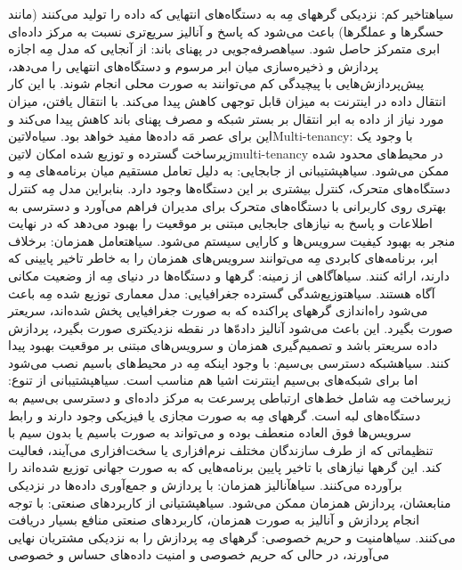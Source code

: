  ‌سیاه{تاخیر کم}: نزدیکی گرههای مِه به دستگاه‌های انتهایی که داده را تولید می‌کنند (مانند حسگرها و عملگرها) باعث می‌شود که پاسخ و آنالیز سریع‌تری
نسبت به مرکز داده‌ای ابری متمرکز حاصل شود.
 ‌سیاه{صرفه‌جویی در پهنای باند}: از آنجایی که مدل مِه اجازه پردازش و ذخیره‌سازی میان ابر مرسوم و دستگاه‌های انتهایی را می‌دهد،
پیش‌پردازش‌هایی با پیچیدگی کم می‌توانند به صورت محلی انجام شوند. با این کار انتقال داده در اینترنت به میزان قابل توجهی کاهش پیدا می‌کند.
با انتقال یافتن، میزان مورد نیاز از داده به ابر انتقال بر بستر شبکه و مصرف پهنای باند کاهش پیدا می‌کند و این برای عصر مَه داده‌ها مفید خواهد بود.
 ‌سیاه{‌لاتین{Multi-tenancy}}: با وجود یک زیرساخت گسترده و توزیع شده امکان ‌لاتین{multi-tenancy} در محیط‌های محدود شده ممکن می‌شود.
 ‌سیاه{پشتیبانی از جابجایی}: به دلیل تعامل مستقیم میان برنامه‌های مِه و دستگاه‌های متحرک، کنترل بیشتری بر این دستگاه‌ها وجود دارد.
بنابراین مدل مِه کنترل بهتری روی کاربرانی با دستگاه‌های متحرک برای مدیران فراهم می‌آورد و دسترسی به اطلاعات و پاسخ به نیازهای جابجایی مبتنی بر موقعیت
را بهبود می‌دهد که در نهایت منجر به بهبود کیفیت سرویس‌ها و کارایی سیستم می‌شود.
 ‌سیاه{تعامل همزمان}: برخلاف ابر، برنامه‌های کابردی مِه می‌توانند سرویس‌های همزمان را به خاطر تاخیر پایینی که دارند، ارائه کنند.
 ‌سیاه{آگاهی از زمینه}: گرهها و دستگاه‌ها در دنیای مِه از وضعیت مکانی آگاه هستند.
 ‌سیاه{توزیع‌شدگی گسترده جغرافیایی}: مدل معماری توزیع شده مِه باعث می‌شود راه‌اندازی گرههای پراکنده که به صورت جغرافیایی پخش شده‌اند،
سریعتر صورت بگیرد. این باعث می‌شود آنالیز داده‌ّها در نقطه نزدیکتری صورت بگیرد، پردازش داده سریعتر باشد و تصمیم‌گیری همزمان و سرویس‌های مبتنی
بر موقعیت بهبود پیدا کنند.
 ‌سیاه{شبکه دسترسی بی‌سیم}: با وجود اینکه مِه در محیط‌های باسیم نصب می‌شود اما برای شبکه‌های بی‌سیم اینترنت اشیا هم مناسب است.
 ‌سیاه{پشتیبانی از تنوع}: زیرساخت مِه شامل خط‌های ارتباطی پرسرعت به مرکز داده‌ای و دسترسی بی‌سیم به دستگاه‌های لبه است.
گرههای مِه به صورت مجازی یا فیزیکی وجود دارند و رابط سرویس‌ها فوق العاده منعطف بوده و می‌تواند به صورت باسیم یا بدون سیم با تنظیماتی که از طرف
سازندگان مختلف نرم‌افزاری یا سخت‌افزاری می‌آیند، فعالیت کند. این گرهها نیازهای با تاخیر پایین برنامه‌هایی که به صورت جهانی توزیع شده‌اند را برآورده می‌کنند.
 ‌سیاه{آنالیز همزمان}: با پردازش و جمع‌آوری داده‌ها در نزدیکی منابعشان، پردازش همزمان ممکن می‌شود.
 ‌سیاه{پشتیانی از کاربردهای صنعتی}: با توجه انجام پردازش و آنالیز به صورت همزمان، کاربردهای صنعتی منافع بسیار دریافت می‌کنند.
 ‌سیاه{امنیت و حریم خصوصی}: گرههای مِه پردازش را به نزدیکی مشتریان نهایی می‌آورند، در حالی که حریم خصوصی و امنیت داده‌های حساس و خصوصی
